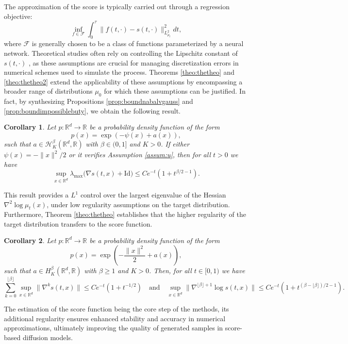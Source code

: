 \documentclass{article}
\newtheorem{corollary}{Corollary}
\begin{document}
The approximation of the score is typically carried out through a regression objective:
$$\inf_{f\in \mathcal{F}} \int_0^\tau \|f(t,\cdot)-s(t,\cdot)\|^2_{L^2_{\mu_t}}dt,$$
where  $\mathcal{F}$ is generally chosen to be a class of functions parameterized by a neural network. Theoretical studies often rely on controlling the Lipschitz constant of $s(t,\cdot)$ \citep{chen2022sampling,chen2023improved,chen2024probability,kwon2022score}, as these assumptions are crucial for managing discretization errors in numerical schemes used to simulate the process. Theorems \ref{theo:thetheo} and \ref{theo:thetheo2} extend the applicability of these assumptions by encompassing a broader range of distributions $\mu_0$ for which these assumptions can be justified. In fact, by synthesizing Propositions \ref{prop:boundnabalvgauss} and \ref{prop:boundimpossiblebuty}, we obtain the following result. 
\begin{corollary}
    Let $p:\mathbb{R}^d\rightarrow \mathbb{R}$ be a probability density function of the form $$p(x)=\exp\left(-\psi(x)+a(x)\right),$$
such that $a \in \mathcal{H}^{\beta}_K(\mathbb{R}^d,\mathbb{R})$ with $\beta\in (0,1]$ and $K>0$. If either $\psi(x)= -\|x\|^2/2$ or it verifies Assumption \ref{assum:u}, then for all $t>0$ we have
$$\sup_{x\in \mathbb{R}^d} \lambda_{\max}\big(\nabla s(t,x)+\text{Id}\big)\leq Ce^{-t}(1+t^{\beta/2-1}).$$
\end{corollary}
This result provides  a $L^1$ control over the largest eigenvalue of the
Hessian $\nabla^2 \log \mu_t(x)$, under low regularity assumptions on the target distribution. Furthermore, Theorem \ref{theo:thetheo} establishes that the higher regularity of the target distribution transfers to the score function. 
\begin{corollary}\label{coro:diffusregu}
Let $p : \mathbb{R}^d \to \mathbb{R}$ be a probability density function of the form
\[
p(x) = \exp\left( -\frac{\|x\|^2}{2} + a(x) \right),
\]
such that \( a \in H^\beta_K(\mathbb{R}^d, \mathbb{R}) \) with \( \beta \geq 1 \) and \( K > 0 \). Then, for all \( t \in [0, 1) \) we have
\[
\sum_{k = 0}^{\lfloor \beta \rfloor} \sup_{x \in \mathbb{R}^d} \|\nabla^k s(t,x)\| \leq Ce^{-t}(1+t^{-1/2})
\quad \text{and} \quad
\sup_{x \in \mathbb{R}^d} \|\nabla^{\lfloor \beta \rfloor +1} \log s(t,x)\| \leq Ce^{-t}(1 +t^{(\beta - \lfloor \beta \rfloor)/2 - 1}).
\]
\end{corollary}

The estimation of the score function being the core step of the methods, its additional regularity ensures enhanced stability and accuracy in numerical approximations, ultimately improving the quality of generated samples in score-based diffusion models.
\end{document}
